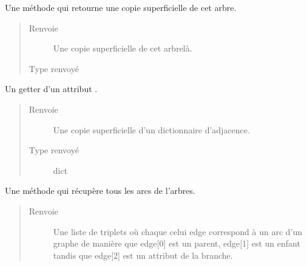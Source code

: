 \documentclass[letterpaper,10pt,french]{sphinxmanual}
\begin{document}
\begin{fulllineitems}
\begin{fulllineitems}
\label{\detokenize{index:StrategyTree.StrategyTree.copy}}
Une méthode qui retourne une copie superficielle de cet arbre.
\begin{quote}\begin{description}
\item[{Renvoie}] \leavevmode
{} \textendash{} Une copie superficielle de cet arbre\sphinxhyphen{}là.

\item[{Type renvoyé}] \leavevmode
{\hyperref[\detokenize{index:StrategyTree.StrategyTree}]{}}

\end{description}\end{quote}

\end{fulllineitems}


\begin{fulllineitems}
\label{\detokenize{index:StrategyTree.StrategyTree.get_adj_dict}}
Un getter d’un attribut .
\begin{quote}\begin{description}
\item[{Renvoie}] \leavevmode
{} \textendash{} Une copie superficielle d’un dictionnaire d’adjacence.

\item[{Type renvoyé}] \leavevmode
dict

\end{description}\end{quote}

\end{fulllineitems}


\begin{fulllineitems}
\label{\detokenize{index:StrategyTree.StrategyTree.get_edges}}
Une méthode qui récupère tous les arcs de l’arbres.
\begin{quote}\begin{description}
\item[{Renvoie}] \leavevmode
{} \textendash{} Une liste de triplets où chaque celui edge correspond à un arc d’un graphe de manière que edge{[}0{]} est un
parent, edge{[}1{]} est un enfant tandis que edge{[}2{]} est un attribut de la branche.


\end{description}
\end{quote}
\end{fulllineitems}
\end{fulllineitems}
\end{document}
